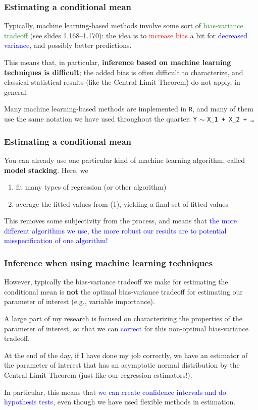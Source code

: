 \documentclass[12pt, 
hyperref={colorlinks=true, linkcolor=blue, urlcolor=cyan},dvipsnames]{beamer}
\begin{document}
\begin{frame}
\frametitle{Estimating a conditional mean}
Typically, machine learning-based methods involve some sort of \textcolor{ForestGreen}{bias-variance tradeoff} (see slides 1.168--1.170): the idea is to \textcolor{red}{increase bias} a bit for \textcolor{blue}{decreased variance}, and possibly better predictions. \pause

This means that, in particular, \textbf{inference based on machine learning techniques is difficult}; the added bias is often difficult to characterize, and classical statistical results (like the Central Limit Theorem) do not apply, in general. \pause

Many machine learning-based methods are implemented in \texttt{R}, and many of them use the same notation we have used throughout the quarter: \texttt{Y} $\sim$ \texttt{X\_1 + X\_2 + \dots}

\end{frame}

\begin{frame}
\frametitle{Estimating a conditional mean}
You can already use one particular kind of machine learning algorithm, called \textbf{model stacking}. Here, we 
\begin{enumerate}
\item fit many types of regression (or other algorithm)
\item average the fitted values from (1), yielding a final set of fitted values
\end{enumerate}
This removes some subjectivity from the process, and means that \textcolor{blue}{the more different algorithms we use, the more robust our results are to potential misspecification of one algorithm!}
\end{frame}

\begin{frame}
\frametitle{Inference when using machine learning techniques}

However, typically the bias-variance tradeoff we make for estimating the conditional mean is \textbf{not} the optimal bias-variance tradeoff for estimating our parameter of interest (e.g., variable importance).

A large part of my research is focused on characterizing the properties of the parameter of interest, so that we can \textcolor{blue}{correct} for this non-optimal bias-variance tradeoff.

At the end of the day, if I have done my job correctly, we have an estimator of the parameter of interest that has an asymptotic normal distribution by the Central Limit Theorem (just like our regression estimators!).

In particular, this means that \textcolor{blue}{we can create confidence intervals and do hypothesis tests}, even though we have used flexible methods in estimation.
\end{frame}
\end{document}
